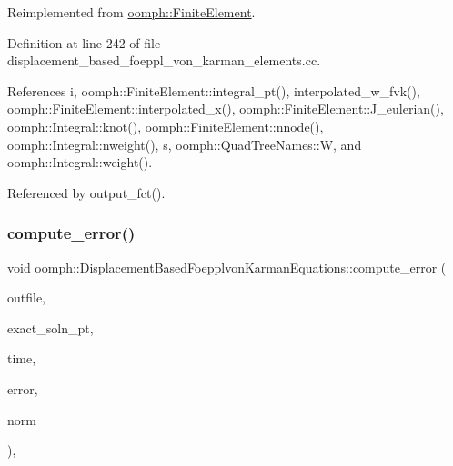 Reimplemented from \hyperlink{classoomph_1_1FiniteElement_a73c79a1f1e5b1d334757812a6bbd58ff}{oomph\+::\+Finite\+Element}.



Definition at line 242 of file displacement\+\_\+based\+\_\+foeppl\+\_\+von\+\_\+karman\+\_\+elements.\+cc.



References i, oomph\+::\+Finite\+Element\+::integral\+\_\+pt(), interpolated\+\_\+w\+\_\+fvk(), oomph\+::\+Finite\+Element\+::interpolated\+\_\+x(), oomph\+::\+Finite\+Element\+::\+J\+\_\+eulerian(), oomph\+::\+Integral\+::knot(), oomph\+::\+Finite\+Element\+::nnode(), oomph\+::\+Integral\+::nweight(), s, oomph\+::\+Quad\+Tree\+Names\+::W, and oomph\+::\+Integral\+::weight().



Referenced by output\+\_\+fct().

\mbox{\label{classoomph_1_1DisplacementBasedFoepplvonKarmanEquations_aab27e73211bd9c4a569730883dc869b3}} 
\subsubsection{\texorpdfstring{compute\+\_\+error()}{compute\_error()}\hspace{0.1cm}{\footnotesize\ttfamily [2/2]}}
{\footnotesize\ttfamily void oomph\+::\+Displacement\+Based\+Foepplvon\+Karman\+Equations\+::compute\+\_\+error (\begin{DoxyParamCaption}\item[{std\+::ostream \&}]{outfile,  }\item[{\hyperlink{classoomph_1_1FiniteElement_ad4ecf2b61b158a4b4d351a60d23c633e}{Finite\+Element\+::\+Unsteady\+Exact\+Solution\+Fct\+Pt}}]{exact\+\_\+soln\+\_\+pt,  }\item[{const double \&}]{time,  }\item[{double \&}]{error,  }\item[{double \&}]{norm }\end{DoxyParamCaption})\hspace{0.3cm}{\ttfamily [inline]}, {\ttfamily [virtual]}}



